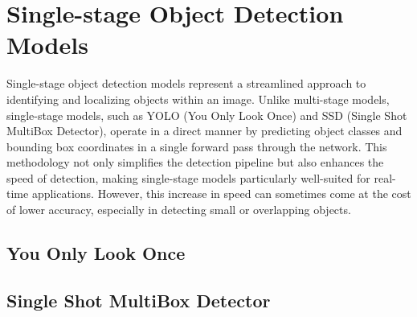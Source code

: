 \section{Single-stage Object Detection Models}

Single-stage object detection models represent a streamlined approach to identifying and localizing objects within an image. Unlike multi-stage models, 
single-stage models, such as YOLO (You Only Look Once) and SSD (Single Shot MultiBox Detector), operate in a direct manner by predicting object classes and 
bounding box coordinates in a single forward pass through the network. This methodology not only simplifies the detection pipeline but also enhances the 
speed of detection, making single-stage models particularly well-suited for real-time applications. However, this increase in speed can sometimes come at 
the cost of lower accuracy, especially in detecting small or overlapping objects.

\subsection{You Only Look Once}

\subsection{Single Shot MultiBox Detector}

